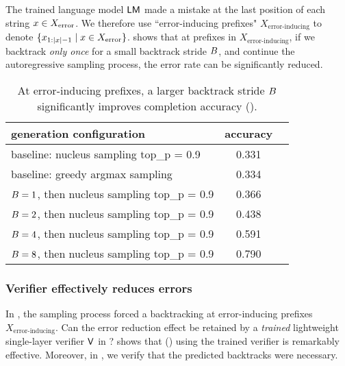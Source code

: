 The trained language model $\mathsf{LM}$ made a mistake at the last position of each string $x \in X_{\text{error}}$.
We therefore use ``error-inducing prefixes" $X_{\text{error-inducing}}$ to denote $\{ x_{1:\left| x \right|-1} \mid x \in X_{\text{error}} \}$.
 shows that at prefixes in $X_{\text{error-inducing}}$, 
if we backtrack \emph{only once} for a small backtrack stride $B$, 
and continue the autoregressive sampling process, 
the error rate can be significantly reduced. 

\begin{table}[h]
\begin{center}
\begin{small}
\begin{tabular}{ lcc }
\toprule
\textbf{generation configuration} & \textbf{accuracy} \\
\hline
baseline: nucleus sampling top\_p = 0.9 & 0.331 \\
\hline
baseline: greedy argmax sampling & 0.334 \\
\hline
$B = 1$, then nucleus sampling top\_p = 0.9 & 0.366 \\
\hline
$B = 2$, then nucleus sampling top\_p = 0.9 & 0.438 \\
\hline
$B = 4$, then nucleus sampling top\_p = 0.9 & 0.591 \\
\hline
$B = 8$, then nucleus sampling top\_p = 0.9 & 0.790 \\
\bottomrule
\end{tabular}
\end{small}
\end{center}
\caption{
At error-inducing prefixes,
a larger backtrack stride $B$ significantly improves completion accuracy ().
}
\label{table:dyck_backtrack_at_error_inducing}
\end{table}




\subsubsection{Verifier effectively reduces errors}
\label{sec:experiments:synthetic:verifier_reduces_errors}

In ,
the sampling process forced a backtracking at error-inducing prefixes $X_{\text{error-inducing}}$.
Can the error reduction effect be retained by a \emph{trained} lightweight single-layer verifier $\mathsf{V}$ in ?
 shows that
\algoName ()
using the trained verifier is remarkably effective.
Moreover, in ,
we verify that the predicted backtracks were necessary.

